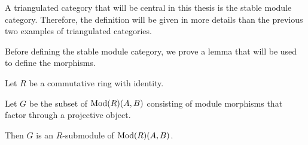 
A triangulated category that will be central in this thesis is the stable module category. Therefore, the definition will be given in more details than the previous two examples of triangulated categories.

Before defining the stable module category, we prove a lemma that will be used to define the morphisms.
\begin{lemma}
    \label{lem:morphisms_factoring_through_projectives_r-submodule}
    Let \( R \) be a commutative ring with identity.

    Let \( G \) be the subset of \( \operatorname{Mod}(R)(A, B) \) consisting of module morphisms that factor through a projective object.

    Then \( G \) is an \( R \)-submodule of \( \operatorname{Mod}(R)(A, B) \).
\end{lemma}
